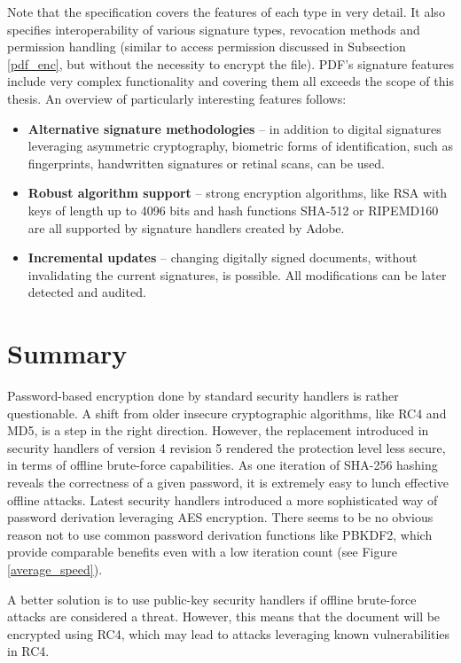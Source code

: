 \documentclass[11pt,oneside]{fithesis2}
\begin{document}
Note that the specification covers the features of each type in very detail. It also specifies interoperability of various signature types, revocation methods and permission handling (similar to access permission discussed in Subsection \ref{pdf_enc}, but without the necessity to encrypt the file). PDF's signature features include very complex functionality \cite{acrobat_dig_signatures} and covering them all exceeds the scope of this thesis. An overview of particularly interesting features follows:

\begin{itemize}
\setlength\itemsep{0.1em}
	\item{\textbf{Alternative signature methodologies} -- in addition to digital signatures leveraging asymmetric cryptography, biometric forms of identification, such as fingerprints, handwritten signatures or retinal scans, can be used.}
	\item{\textbf{Robust algorithm support} -- strong encryption algorithms, like RSA with keys of length up to 4096 bits and hash functions SHA-512 or RIPEMD160 are all supported by signature handlers created by Adobe.}
	\item{\textbf{Incremental updates} -- changing digitally signed documents, without invalidating the current signatures, is possible. All modifications can be later detected and audited.}
\end{itemize}

\section{Summary}\label{pdf_summ}

Password-based encryption done by standard security handlers is rather questionable. A shift from older insecure cryptographic algorithms, like RC4 and MD5, is a step in the right direction. However, the replacement introduced in security handlers of version 4 revision 5 rendered the protection level less secure, in terms of offline brute-force capabilities. As one iteration of SHA-256 hashing reveals the correctness of a given password, it is extremely easy to lunch effective offline attacks. Latest security handlers introduced a more sophisticated way of password derivation leveraging AES encryption. There seems to be no obvious reason not to use common password derivation functions like PBKDF2, which provide comparable benefits even with a low iteration count (see Figure \ref{average_speed}). 

A better solution is to use public-key security handlers if offline brute-force attacks are considered a threat. However, this means that the document will be encrypted using RC4, which may lead to attacks leveraging known vulnerabilities in RC4. 
\end{document}
